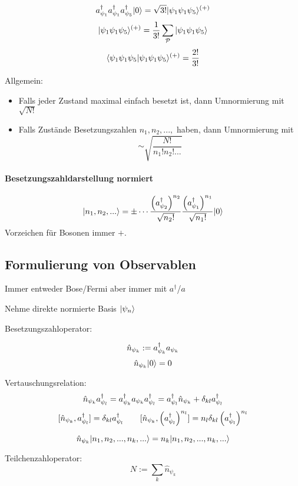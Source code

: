 \documentclass[11pt,a4paper]{report}
\begin{document}
$$a_{\psi_{1}}^\dagger a_{\psi_{1}}^\dagger a_{\psi_{5}}^\dagger|0\rangle = \sqrt{3!}|\psi_1\psi_1\psi_5\rangle^{(+)}$$
$$|\psi_1\psi_1\psi_5\rangle^{(+)}=\frac{1}{3!}\sum_{\mathcal{P}}|\psi_1\psi_1\psi_5\rangle$$
$$\langle \psi_1\psi_1\psi_5 | \psi_1\psi_1\psi_5 \rangle^{(+ )} = \frac{2!}{3!}$$

Allgemein: 
\begin{itemize}
\item Falls jeder Zustand maximal einfach besetzt ist, dann Umnormierung mit $\sqrt{N!}$
\item Falls Zustände Besetzungszahlen $n_1, n_2,...,$ haben, dann Umnormierung mit
$$\sim \sqrt{\frac{N!}{n_1!n_2!...}}$$
\end{itemize}
\paragraph{Besetzungszahldarstellung normiert}
$$|n_1,n_2,...\rangle=\pm \cdots \frac{\left(a_{\psi_2}^\dagger\right)^{n_2}}{\sqrt{n_2 !}} \frac{\left(a_{\psi_1}^\dagger\right)^{n_1}}{\sqrt{n_1 !}}|0\rangle$$
Vorzeichen für Bosonen immer $+$.

\subsection{Formulierung von Observablen}

Immer entweder Bose/Fermi aber immer mit $a^\dagger$/$a$\par 

Nehme direkte normierte Basis $|\psi_n\rangle$\par

Besetzungszahloperator:
\newcommand{\anzahl}[1]{\hat{n}_{\psi_{#1}}}
\newcommand{\vac}{\ket{0}}

$$\hat{n}_{\psi_k} := a_{\psi_k}^\dagger a_{\psi_k}$$
$$\anzahl{k}\vac =  0$$

Vertauschungsrelation:
$$\anzahl{k}\create{\psi_l}=\create{\psi_k}\destroy{\psi_k}\create{\psi_l} = \create{\psi_l}\anzahl{k}+\delta_{kl}\create{\psi_l}$$
$$[\anzahl{k},\create{\psi_l}]=\delta_{kl}\create{\psi_l} \qquad [\anzahl{k},\left(\create{\psi_l}\right)^{n_l}]=n_l\delta_{kl}\left(\create{\psi_l}\right)^{n_l}$$

$$\anzahl{k}\ket{n_1,n_2,...,n_k,...} = n_k\ket{n_1,n_2,...,n_k,...}$$

Teilchenzahloperator:
$$N :=\sum_k\anzahl{k}$$

\newcommand{\cre}[1]{\create{\psi_{#1}}}
\newcommand{\des}[1]{\destroy{\psi_{#1}}}
\end{document}
